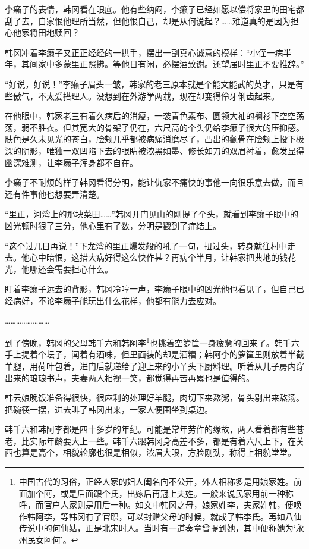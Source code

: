 李癞子的表情，韩冈看在眼底。他有些纳闷，李癞子已经如愿以偿将家里的田宅都刮了去，自家恨他理所当然，但他恨自己，却是从何说起？……难道真的是因为担心他家将田地赎回？

韩冈冲着李癞子又正正经经的一拱手，摆出一副真心诚意的模样：“小侄一病半年，其间家中多蒙里正照拂。等他日有闲，必摆酒致谢。还望届时里正不要推辞。”

“好说，好说！”李癞子眉头一皱，韩家的老三原本就是个能文能武的英才，只是有些傲气，不太爱搭理人。没想到在外游学两载，现在却变得伶牙俐齿起来。

在他眼中，韩家老三有着久病后的消瘦，一袭青色素布、圆领大袖的襕衫下空空荡荡，弱不胜衣。但其宽大的骨架子仍在，六尺高的个头仍给李癞子很大的压抑感。肤色是久未见光的苍白，脸颊几乎都被病痛消磨尽了，凸出的颧骨在脸颊上投下极深的阴影，唯独一双凹陷下去的眼睛被浓黑如墨、修长如刀的双眉衬着，愈发显得幽深难测，让李癞子浑身都不自在。

李癞子不耐烦的样子韩冈看得分明，能让仇家不痛快的事他一向很乐意去做，而且还有件事他也想要弄清楚。

“里正，河湾上的那块菜田……”韩冈开门见山的刚提了个头，就看到李癞子眼中的凶光顿时狠了三分，他心里有了数，分明是戳到了症结上。

“这个过几日再说！”下龙湾的里正爆发般的吼了一句，扭过头，转身就往村中走去。他心中暗恨，这措大病好得这么快作甚？再病个半月，让韩家把典地的钱花光，他哪还会需要担心什么。

盯着李癞子远去的背影，韩冈冷哼一声，李癞子眼中的凶光他也看见了，但自己已经病好，不论李癞子能玩出什么花样，他都有能力去应对。

……………………

到了傍晚，韩冈的父母韩千六和韩阿李\footnote{中国古代的习俗，正经人家的妇人闺名向不公开，外人相称多是用娘家姓。前面加个阿，或是后面跟个氏，出嫁后再冠上夫姓。一般来说民家用前一种称呼，而官户人家则是用后一种。如文中韩冈之母，娘家姓李，夫家姓韩，便唤作韩阿李，等韩冈有了官职，可以封赠父母的时候，就成了韩李氏。再如八仙传说中的何仙姑，正是北宋时人。当时有一道奏章曾提到她，其中便称她为‘永州民女阿何’。}也挑着空箩筐一身疲惫的回来了。韩千六手上提着个坛子，闻着有酒味，但里面装的却是酒糟；韩阿李的箩筐里则放着半截羊腿，用荷叶包着，进门后就递给了迎上来的小丫头下厨料理。听着从儿子房内穿出来的琅琅书声，夫妻两人相视一笑，都觉得再苦再累也是值得的。

韩云娘晚饭准备得很快，很麻利的处理好羊腿，肉切下来熬粥，骨头剔出来熬汤。把碗筷一摆，进去叫了韩冈出来，一家人便围坐到桌边。

韩千六和韩阿李都是四十多岁的年纪。可能是常年劳作的缘故，两人看着都有些苍老，比实际年龄要大上一些。韩千六跟韩冈身高差不多，都是有着六尺上下，在关西也算是高个，相貌轮廓也很是相似，浓眉大眼，方脸刚劲，称得上相貌堂堂。

